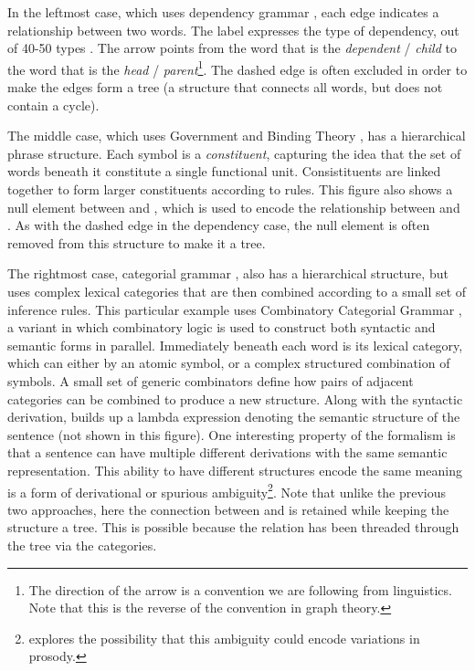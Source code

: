 In the leftmost case, which uses dependency grammar \parencite[\depgr][]{dependency-grammar}, each edge indicates a relationship between two words.
The label expresses the type of dependency, out of 40-50 types \parencite{ud,sd}.
The arrow points from the word that is the \textit{dependent} / \textit{child} to the word that is the \textit{head} / \textit{parent}\footnote{The direction of the arrow is a convention we are following from linguistics. Note that this is the reverse of the convention in graph theory.}.
The dashed edge is often excluded in order to make the edges form a tree (a structure that connects all words, but does not contain a cycle).

The middle case, which uses Government and Binding Theory \parencite[\gb][]{gb}, has a hierarchical phrase structure.
Each symbol is a \textit{constituent}, capturing the idea that the set of words beneath it constitute a single functional unit.
Consistituents are linked together to form larger constituents according to rules.
This figure also shows a null element between  and , which is used to encode the relationship between  and .
As with the dashed edge in the dependency case, the null element is often removed from this structure to make it a tree.

The rightmost case, categorial grammar \parencite{categorial-grammar}, also has a hierarchical structure, but uses complex lexical categories that are then combined according to a small set of inference rules.
This particular example uses Combinatory Categorial Grammar \parencite[\ccg][]{Steedman:2000}, a variant in which combinatory logic is used to construct both syntactic and semantic forms in parallel.
Immediately beneath each word is its lexical category, which can either by an atomic symbol, or a complex structured combination of symbols.
A small set of generic combinators define how pairs of adjacent categories can be combined to produce a new structure.
Along with the syntactic derivation, \ccg builds up a lambda expression denoting the semantic structure of the sentence (not shown in this figure).
One interesting property of the formalism is that a sentence can have multiple different derivations with the same semantic representation.
This ability to have different structures encode the same meaning is a form of derivational or spurious ambiguity\footnote{\textcite{Steedman:2000} explores the possibility that this ambiguity could encode variations in prosody.}.
Note that unlike the previous two approaches, here the connection between  and  is retained while keeping the structure a tree.
This is possible because the relation has been threaded through the tree via the categories.

